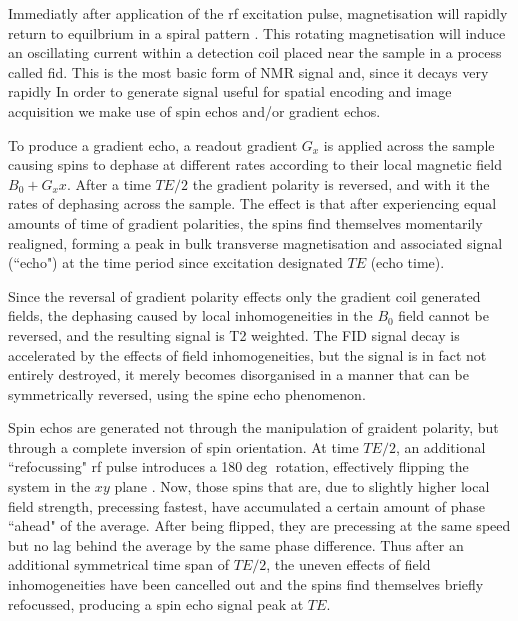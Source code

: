Immediatly after application of the \gls{rf} excitation pulse, magnetisation will rapidly return to equilbrium in a spiral pattern .
This rotating magnetisation will induce an oscillating current within a detection coil placed near the sample in a process called \gls{fid}.
This is the most basic form of NMR signal and, since it decays very rapidly 
In order to generate signal useful for spatial encoding and image acquisition  we make use of spin echos and/or gradient echos.

To produce a gradient echo, a readout gradient $G_x$  is applied across the sample causing spins to dephase at different rates according to their local magnetic field $B_0 + G_xx$.
After a time $TE/2$  the gradient polarity is reversed, and with it the rates of dephasing across the sample.
The effect is that after experiencing equal amounts of time of gradient polarities, the spins find themselves momentarily realigned, forming a peak in bulk transverse magnetisation and associated signal (``echo") at the time period since excitation designated $TE$ (echo time).

Since the reversal of gradient polarity effects only the gradient coil generated fields, the dephasing caused by local inhomogeneities in the $B_0$ field cannot be reversed, and the resulting signal is T2\* weighted. 
The FID signal decay is accelerated by the effects of field inhomogeneities, but the signal is in fact not entirely destroyed, it merely becomes disorganised in a manner that can be symmetrically reversed, using the spine echo phenomenon.

Spin echos are generated not through the manipulation of graident polarity, but through a complete inversion of spin orientation. 
At time $TE/2$, an additional ``refocussing" \gls{rf} pulse introduces a 180$\deg$ rotation, effectively flipping the system in the $xy$ plane .
Now, those spins that are, due to slightly higher local field strength, precessing fastest, have accumulated a certain amount of phase ``ahead" of the average.
After being flipped, they are precessing at the same speed but no lag behind the average by the same phase difference.
Thus after an additional symmetrical time span of $TE/2$, the uneven effects of field inhomogeneities have been cancelled out and the spins find themselves briefly refocussed, producing a spin echo signal peak at $TE$.

